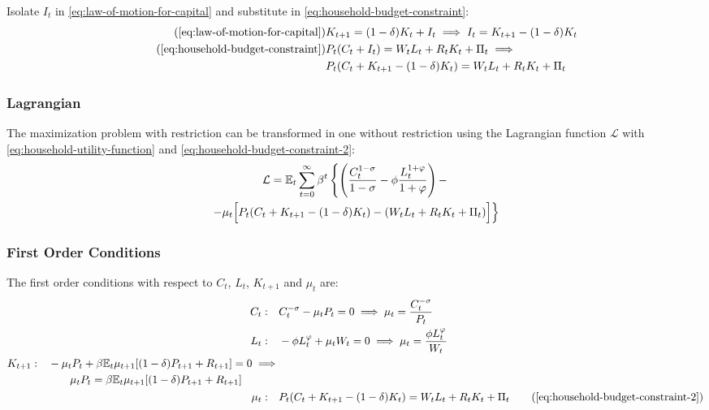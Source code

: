 \documentclass[
thesis.tex
]{subfiles}
\begin{document}
	Isolate $I_t$ in \ref{eq:law-of-motion-for-capital} and substitute in \ref{eq:household-budget-constraint}:
	\begin{align}
		\tag{\ref{eq:law-of-motion-for-capital}}
		& K_{t+1} = (1-\delta)K_t + I_t \implies I_t = K_{t+1} - (1-\delta)K_t \\
		\tag{\ref{eq:household-budget-constraint}}
		& P_t (C_t + I_t) = W_t L_t + R_t K_t + \Pi_t \implies \\
		\label{eq:household-budget-constraint-2}
		& P_t (C_t + K_{t+1} - (1-\delta)K_t) = W_t L_t + R_t K_t + \Pi_t
	\end{align}
	
	\subsubsection*{Lagrangian}
	
	The maximization problem with restriction can be transformed in one without restriction using the Lagrangian function $\mathcal{L}$ with \ref{eq:household-utility-function} and \ref{eq:household-budget-constraint-2}:
	\begin{multline}
		\label{eq:household-lagrangian}
		\mathcal{L} = \mathbb{E}_t \sum_{t=0}^{\infty} \beta^t 
		\left\{ \left( \frac{C_t^{1-\sigma}}{1-\sigma} - \phi \frac{L_t^{1+\varphi}}{1+\varphi} \right) - \right.
		\\
		\left. -\mu_t \Bigr[ P_t (C_t + K_{t+1} - (1-\delta) K_t) - (W_t L_t + R_t K_t + \Pi_t) \Bigl] \right\}
	\end{multline}
	
	\subsubsection*{First Order Conditions}
	
	The first order conditions with respect to $C_t$, $L_t$, $K_{t+1}$ and $\mu_t$ are:
	\begin{align}
		C_t: \quad & C_t^{-\sigma} -\mu_t P_t = 0 \implies \mu_t = \frac{C_t^{-\sigma}}{P_t} \label{eq:household-FOC-Ct} \\
		L_t: \quad & -\phi L_t^{\varphi} +\mu_t W_t = 0 \implies \mu_t = \frac{\phi L_t^{\varphi}}{W_t} \label{eq:household-FOC-Lt} \\
		\begin{split}
			K_{t+1}: \quad & -\mu_t P_t +\beta \mathbb{E}_t \mu_{t+1} [(1-\delta) P_{t+1} + R_{t+1}] = 0 \implies \\ & \qquad \mu_t P_t = \beta \mathbb{E}_t \mu_{t+1} [(1-\delta) P_{t+1} + R_{t+1}]
		\end{split} \label{eq:household-FOC-Kt} \\
		\mu_t: \quad & P_t (C_t + K_{t+1} - (1-\delta)K_t) = W_t L_t + R_t K_t + \Pi_t \tag{\ref{eq:household-budget-constraint-2}}
	\end{align}
	
\end{document}
